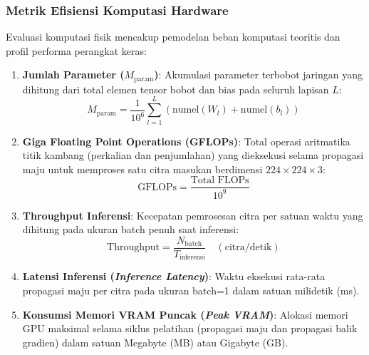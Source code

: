 \subsubsection{Metrik Efisiensi Komputasi Hardware}
Evaluasi komputasi fisik mencakup pemodelan beban komputasi teoritis dan profil performa perangkat keras:
\begin{enumerate}[noitemsep]
	\item \textbf{Jumlah Parameter ($M_{\text{param}}$)}: Akumulasi parameter terbobot jaringan yang dihitung dari total elemen tensor bobot dan bias pada seluruh lapisan $L$:
	\begin{equation}
		M_{\text{param}} = \frac{1}{10^6} \sum_{l=1}^{L} \left( \text{numel}(W_l) + \text{numel}(b_l) \right)
	\end{equation}

	\item \textbf{Giga Floating Point Operations (GFLOPs)}: Total operasi aritmatika titik kambang (perkalian dan penjumlahan) yang dieksekusi selama propagasi maju untuk memproses satu citra masukan berdimensi $224 \times 224 \times 3$:
	\begin{equation}
		\text{GFLOPs} = \frac{\text{Total FLOPs}}{10^9}
	\end{equation}

	\item \textbf{Throughput Inferensi}: Kecepatan pemrosesan citra per satuan waktu yang dihitung pada ukuran batch penuh saat inferensi:
	\begin{equation}
		\text{Throughput} = \frac{N_{\text{batch}}}{T_{\text{inferensi}}} \quad (\text{citra/detik})
	\end{equation}

	\item \textbf{Latensi Inferensi (\textit{Inference Latency})}: Waktu eksekusi rata-rata propagasi maju per citra pada ukuran batch=1 dalam satuan milidetik (ms).
	\item \textbf{Konsumsi Memori VRAM Puncak (\textit{Peak VRAM})}: Alokasi memori GPU maksimal selama siklus pelatihan (propagasi maju dan propagasi balik gradien) dalam satuan Megabyte (MB) atau Gigabyte (GB).
\end{enumerate}

